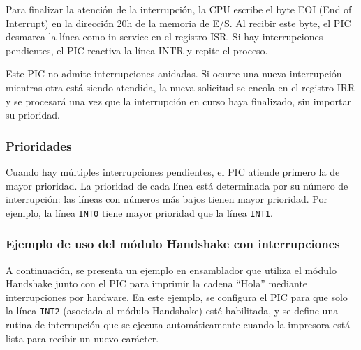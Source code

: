 \documentclass[12pt,oneside]{templates/unerthesis}
\begin{document}
Para finalizar la atención de la interrupción, la CPU escribe el byte EOI (End of Interrupt) en la dirección 20h de la memoria de E/S. Al recibir este byte, el PIC desmarca la línea como in-service en el registro ISR. Si hay interrupciones pendientes, el PIC reactiva la línea INTR y repite el proceso.

Este PIC no admite interrupciones anidadas. Si ocurre una nueva interrupción mientras otra está siendo atendida, la nueva solicitud se encola en el registro IRR y se procesará una vez que la interrupción en curso haya finalizado, sin importar su prioridad.

\hypertarget{prioridades}{%
\subsubsection{Prioridades}\label{prioridades}}

Cuando hay múltiples interrupciones pendientes, el PIC atiende primero la de mayor prioridad. La prioridad de cada línea está determinada por su número de interrupción: las líneas con números más bajos tienen mayor prioridad. Por ejemplo, la línea \texttt{INT0} tiene mayor prioridad que la línea \texttt{INT1}.

\hypertarget{ejemplo-de-uso-del-muxf3dulo-handshake-con-interrupciones}{%
\subsubsection{Ejemplo de uso del módulo Handshake con interrupciones}\label{ejemplo-de-uso-del-muxf3dulo-handshake-con-interrupciones}}

A continuación, se presenta un ejemplo en ensamblador que utiliza el módulo Handshake junto con el PIC para imprimir la cadena ``Hola'' mediante interrupciones por hardware. En este ejemplo, se configura el PIC para que solo la línea \texttt{INT2} (asociada al módulo Handshake) esté habilitada, y se define una rutina de interrupción que se ejecuta automáticamente cuando la impresora está lista para recibir un nuevo carácter.
\end{document}
